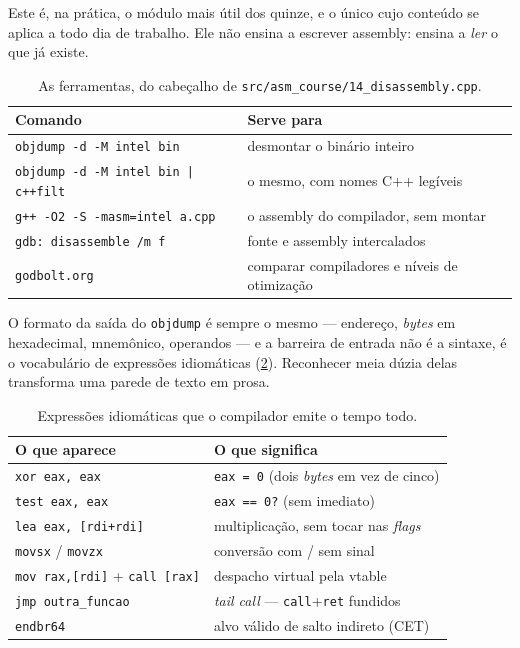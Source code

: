 Este é, na prática, o módulo mais útil dos quinze, e o único cujo conteúdo se
aplica a todo dia de trabalho. Ele não ensina a escrever assembly: ensina a
\emph{ler} o que já existe.

\begin{table}[htbp]
\centering
\caption{As ferramentas, do cabeçalho de
         \texttt{src/asm\_course/14\_disassembly.cpp}.}
\label{tab:ferramentas-disasm}
\footnotesize
\begin{tabular}{@{}ll@{}}
\toprule
\textbf{Comando} & \textbf{Serve para} \\
\midrule
\texttt{objdump -d -M intel bin} & desmontar o binário inteiro \\
\texttt{objdump -d -M intel bin | c++filt} & o mesmo, com nomes C++ legíveis \\
\texttt{g++ -O2 -S -masm=intel a.cpp} & o assembly do compilador, sem montar \\
\texttt{gdb: disassemble /m f} & fonte e assembly intercalados \\
\texttt{godbolt.org} & comparar compiladores e níveis de otimização \\
\bottomrule
\end{tabular}
\end{table}

O formato da saída do \texttt{objdump} é sempre o mesmo --- endereço,
\emph{bytes} em hexadecimal, mnemônico, operandos --- e a barreira de entrada
não é a sintaxe, é o vocabulário de expressões idiomáticas
(\cref{tab:idiomas-asm}). Reconhecer meia dúzia delas transforma uma parede de
texto em prosa.

\begin{table}[htbp]
\centering
\caption{Expressões idiomáticas que o compilador emite o tempo todo.}
\label{tab:idiomas-asm}
\footnotesize
\begin{tabular}{@{}ll@{}}
\toprule
\textbf{O que aparece} & \textbf{O que significa} \\
\midrule
\texttt{xor eax, eax}        & \texttt{eax = 0} (dois \emph{bytes} em vez de cinco) \\
\texttt{test eax, eax}       & \texttt{eax == 0?} (sem imediato) \\
\texttt{lea eax, [rdi+rdi]}  & multiplicação, sem tocar nas \emph{flags} \\
\texttt{movsx} / \texttt{movzx} & conversão com / sem sinal \\
\texttt{mov rax,[rdi]} + \texttt{call [rax]} & despacho virtual pela \gls{vtable} \\
\texttt{jmp outra\_funcao}   & \emph{tail call} --- \texttt{call}+\texttt{ret} fundidos \\
\texttt{endbr64}             & alvo válido de salto indireto (CET) \\
\bottomrule
\end{tabular}
\end{table}

